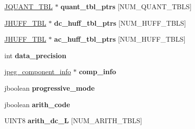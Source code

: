 \begin{DoxyCompactItemize}
\item 
\hyperlink{struct_j_q_u_a_n_t___t_b_l}{J\+Q\+U\+A\+N\+T\+\_\+\+T\+BL} $\ast$ {\bfseries quant\+\_\+tbl\+\_\+ptrs} \mbox{[}N\+U\+M\+\_\+\+Q\+U\+A\+N\+T\+\_\+\+T\+B\+LS\mbox{]}\hypertarget{structjpeg__decompress__struct_a42be2e7197a38cf83e6cebbaac006ca6}{}\label{structjpeg__decompress__struct_a42be2e7197a38cf83e6cebbaac006ca6}

\item 
\hyperlink{struct_j_h_u_f_f___t_b_l}{J\+H\+U\+F\+F\+\_\+\+T\+BL} $\ast$ {\bfseries dc\+\_\+huff\+\_\+tbl\+\_\+ptrs} \mbox{[}N\+U\+M\+\_\+\+H\+U\+F\+F\+\_\+\+T\+B\+LS\mbox{]}\hypertarget{structjpeg__decompress__struct_a805ecdbfbc59d66a6879de06dc4c35e0}{}\label{structjpeg__decompress__struct_a805ecdbfbc59d66a6879de06dc4c35e0}

\item 
\hyperlink{struct_j_h_u_f_f___t_b_l}{J\+H\+U\+F\+F\+\_\+\+T\+BL} $\ast$ {\bfseries ac\+\_\+huff\+\_\+tbl\+\_\+ptrs} \mbox{[}N\+U\+M\+\_\+\+H\+U\+F\+F\+\_\+\+T\+B\+LS\mbox{]}\hypertarget{structjpeg__decompress__struct_a8d6e49569f3edc0ad43ffa5d6a95bb48}{}\label{structjpeg__decompress__struct_a8d6e49569f3edc0ad43ffa5d6a95bb48}

\item 
int {\bfseries data\+\_\+precision}\hypertarget{structjpeg__decompress__struct_ad55d8fc56faa42d05d1a80ad84ce3e9c}{}\label{structjpeg__decompress__struct_ad55d8fc56faa42d05d1a80ad84ce3e9c}

\item 
\hyperlink{structjpeg__component__info}{jpeg\+\_\+component\+\_\+info} $\ast$ {\bfseries comp\+\_\+info}\hypertarget{structjpeg__decompress__struct_afb7ab593b5699842965eccb64e6e200a}{}\label{structjpeg__decompress__struct_afb7ab593b5699842965eccb64e6e200a}

\item 
jboolean {\bfseries progressive\+\_\+mode}\hypertarget{structjpeg__decompress__struct_acdb18a19970e948713d74f9b36085235}{}\label{structjpeg__decompress__struct_acdb18a19970e948713d74f9b36085235}

\item 
jboolean {\bfseries arith\+\_\+code}\hypertarget{structjpeg__decompress__struct_a6133e81946f44509b7f9aaa748e0a200}{}\label{structjpeg__decompress__struct_a6133e81946f44509b7f9aaa748e0a200}

\item 
U\+I\+N\+T8 {\bfseries arith\+\_\+dc\+\_\+L} \mbox{[}N\+U\+M\+\_\+\+A\+R\+I\+T\+H\+\_\+\+T\+B\+LS\mbox{]}\hypertarget{structjpeg__decompress__struct_a746b5ecfe0401a1ffe423191d4b929b0}{}\label{structjpeg__decompress__struct_a746b5ecfe0401a1ffe423191d4b929b0}


\end{DoxyCompactItemize}

